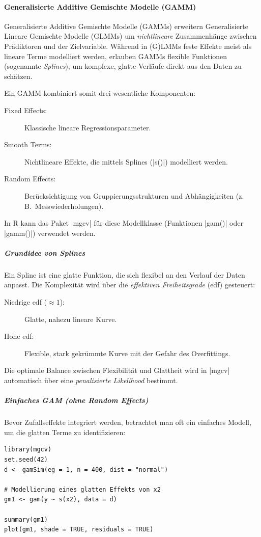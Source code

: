 \documentclass[10pt,twocolumn]{scrartcl}
\renewcommand{\lstinline}{\mycoloredinline}
\begin{document}
\paragraph{Generalisierte Additive Gemischte Modelle (GAMM)}

Generalisierte Additive Gemischte Modelle (GAMMs) erweitern Generalisierte Lineare Gemischte Modelle (GLMMs) um \emph{nichtlineare} Zusammenhänge zwischen Prädiktoren und der Zielvariable. Während in (G)LMMs feste Effekte meist als lineare Terme modelliert werden, erlauben GAMMs flexible Funktionen (sogenannte \emph{Splines}), um komplexe, glatte Verläufe direkt aus den Daten zu schätzen.

Ein GAMM kombiniert somit drei wesentliche Komponenten:
\begin{description}
\item[Fixed Effects:] Klassische lineare Regressionsparameter.
\item[Smooth Terms:] Nichtlineare Effekte, die mittels Splines (\lstinline|s()|) modelliert werden.
\item[Random Effects:] Berücksichtigung von Gruppierungsstrukturen und Abhängigkeiten (z.\,B.\ Messwiederholungen).
\end{description}

In R kann das Paket \lstinline|mgcv| für diese Modellklasse (Funktionen \lstinline|gam()| oder \lstinline|gamm()|) verwendet werden.

\subparagraph{Grundidee von Splines}

Ein Spline ist eine glatte Funktion, die sich flexibel an den Verlauf der Daten anpasst. Die Komplexität wird über die \emph{effektiven Freiheitsgrade} (edf) gesteuert:
\begin{description}
\item[Niedrige edf ($\approx 1$):] Glatte, nahezu lineare Kurve.
\item[Hohe edf:] Flexible, stark gekrümmte Kurve mit der Gefahr des Overfittings.
\end{description}

Die optimale Balance zwischen Flexibilität und Glattheit wird in \lstinline|mgcv| automatisch über eine \emph{penalisierte Likelihood} bestimmt.

\subparagraph{Einfaches GAM (ohne Random Effects)}

Bevor Zufallseffekte integriert werden, betrachtet man oft ein einfaches Modell, um die glatten Terme zu identifizieren:

\begin{lstlisting}
library(mgcv)
set.seed(42)
d <- gamSim(eg = 1, n = 400, dist = "normal")

# Modellierung eines glatten Effekts von x2
gm1 <- gam(y ~ s(x2), data = d)

summary(gm1)
plot(gm1, shade = TRUE, residuals = TRUE)
\end{lstlisting}
\end{document}
